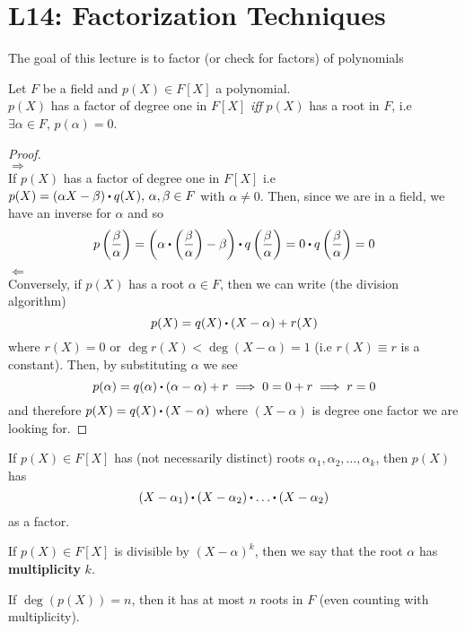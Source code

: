 \documentclass[../Main.tex]{subfiles}
\begin{document}
\chapter{L14: Factorization Techniques}
The goal of this lecture is to factor (or check for factors) of polynomials

\begin{prop}[title = Linear factors are roots]
	Let $F$ be a field and $p(X)\in F[X]$ a polynomial.\\
	$p(X)$ has a factor of degree one in $F[X]$ \textit{iff} $p(X)$ has a root in $F$, i.e $\exists \alpha \in F,\, p(\alpha)=0$.
\end{prop}
\begin{proof}~\\
	$\Longrightarrow$\\
	If $p(X)$ has a factor of degree one in $F[X]$ i.e $p(X)=(\alpha X-\beta) \rdot q(X),\, \alpha,\beta \in F$ with $\alpha\ne 0$. Then, since we are in a field, we have an inverse for $\alpha$ and so
	\[p\left(\frac{\beta}{\alpha}\right)=\left(\alpha \rdot \left(\frac{\beta}{\alpha}\right) - \beta \right)\rdot q\left(\frac{\beta}{\alpha}\right) = 0 \rdot  q\left(\frac{\beta}{\alpha}\right)=0\]
	$\Longleftarrow$\\
	Conversely, if $p(X)$ has a root $\alpha \in F$, then we can write (the division algorithm)
	\[p(X)=q(X)\rdot (X-\alpha)+r(X)\]
	where $r(X)=0$ or $\deg r(X)< \deg (X-\alpha) =1$ (i.e $r(X)\equiv r$ is a constant). Then, by substituting $\alpha$ we see
	\[p(\alpha)=q(\alpha)\rdot (\alpha-\alpha)+r \implies 0 = 0 +r \implies r=0\]
	and therefore $p(X) = q(X)\rdot (X-\alpha)$ where $(X-\alpha)$ is degree one factor we are looking for.
\end{proof}
\begin{crl}[title = Multiple roots form product of linear factors as factor]
	If $p(X)\in F[X]$ has (not necessarily distinct) roots $\alpha_1,\alpha_2,\dots,\alpha_k$, then $p(X)$ has
	\[(X-\alpha_1)\rdot (X-\alpha_2)\rdot \dots\rdot (X-\alpha_2)\]
	as a factor.
\end{crl}
\begin{dfn}[title=Multiplicity]
	If $p(X)\in F[X]$ is divisible by $(X-\alpha)^k$, then we say that the root $\alpha$ has \textbf{multiplicity} $k$.
\end{dfn}
\begin{crl}[title = \texorpdfstring{$p(X)$}{p(X)} has at most \texorpdfstring{$n$}{n} roots]
	If $\deg(p(X))=n$, then it has at most $n$ roots in $F$ (even counting with multiplicity).
\end{crl}
\end{document}
